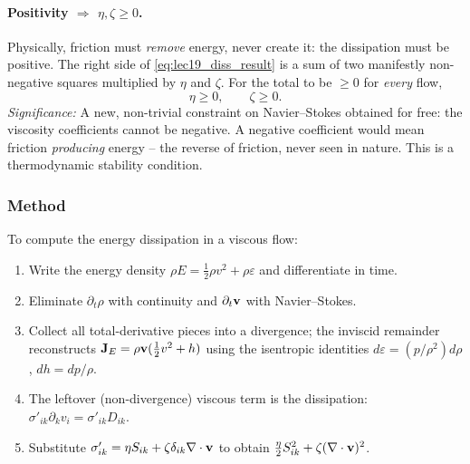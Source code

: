 \documentclass[../main.tex]{subfiles}
\begin{document}
\paragraph{Positivity $\Rightarrow$ $\eta,\zeta\ge0$.} Physically, friction must \emph{remove} energy, never create it: the dissipation must be positive. The right side of \eqref{eq:lec19_diss_result} is a sum of two manifestly non-negative squares multiplied by $\eta$ and $\zeta$. For the total to be $\ge0$ for \emph{every} flow,
\begin{equation}
  \boxed{\;\eta\ge0,\qquad \zeta\ge0.\;}
  \label{eq:lec19_positivity}
\end{equation}
\textit{Significance:} A new, non-trivial constraint on Navier--Stokes obtained for free: the viscosity coefficients cannot be negative. A negative coefficient would mean friction \emph{producing} energy -- the reverse of friction, never seen in nature. This is a thermodynamic stability condition.

\subsubsection*{Method}
To compute the energy dissipation in a viscous flow:
\begin{enumerate}
  \item Write the energy density $\rho E=\tfrac12\rho v^2+\rho\varepsilon$ and differentiate in time.
  \item Eliminate $\partial_t\rho$ with continuity and $\partial_t\mathbf{v}$ with Navier--Stokes.
  \item Collect all total-derivative pieces into a divergence; the inviscid remainder reconstructs $\mathbf{J}_E=\rho\mathbf{v}(\tfrac12v^2+h)$ using the isentropic identities $d\varepsilon=(p/\rho^2)d\rho$, $dh=dp/\rho$.
  \item The leftover (non-divergence) viscous term is the dissipation: $\sigma'_{ik}\partial_k v_i=\sigma'_{ik}D_{ik}$.
  \item Substitute $\sigma'_{ik}=\eta S_{ik}+\zeta\delta_{ik}\nabla \cdot\mathbf{v}$ to obtain $\tfrac{\eta}{2}S_{ik}^2+\zeta(\nabla \cdot\mathbf{v})^2$.
\end{enumerate}

\end{document}

